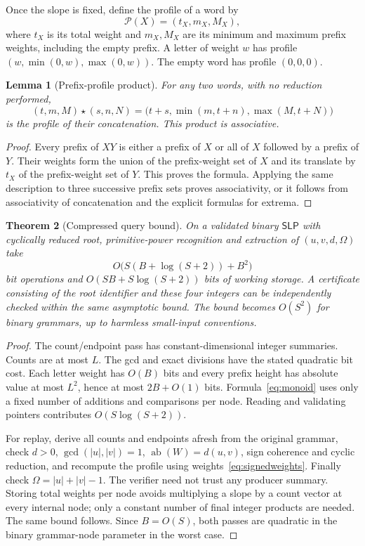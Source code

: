 \documentclass[11pt,letterpaper]{article}
\newtheorem{theorem}{Theorem}[section]
\newtheorem{lemma}[theorem]{Lemma}
\theoremstyle{definition}
\newcommand{\ab}{\operatorname{ab}}
\newcommand{\SLP}{\mathsf{SLP}}
\begin{document}
Once the slope is fixed, define the profile of a word by
\[
 \mathcal P(X)=(t_X,m_X,M_X),
\]
where $t_X$ is its total weight and $m_X,M_X$ are its minimum and maximum
prefix weights, including the empty prefix. A letter of weight $w$ has
profile $(w,\min(0,w),\max(0,w))$. The empty word has profile $(0,0,0)$.

\begin{lemma}[Prefix-profile product]
\label{lem:monoid}
For any two words, with no reduction performed,
\begin{equation}
 (t,m,M)\star(s,n,N)
 =\bigl(t+s,\min(m,t+n),\max(M,t+N)\bigr)
 \label{eq:monoid}
\end{equation}
is the profile of their concatenation. This product is associative.
\end{lemma}
\begin{proof}
Every prefix of $XY$ is either a prefix of $X$ or all of $X$ followed by a
prefix of $Y$. Their weights form the union of the prefix-weight set of $X$
and its translate by $t_X$ of the prefix-weight set of $Y$. This proves the
formula. Applying the same description to three successive prefix sets
proves associativity, or it follows from associativity of concatenation and
the explicit formulas for extrema.
\end{proof}

\begin{theorem}[Compressed query bound]
\label{thm:query}
On a validated binary $\SLP$ with cyclically reduced root, primitive-power
recognition and extraction of $(u,v,d,\Omega)$ take
\begin{equation}
 O\bigl(S(B+\log(S+2))+B^2\bigr)
 \label{eq:localcost}
\end{equation}
bit operations and $O(SB+S\log(S+2))$ bits of working storage.
A certificate consisting of the root identifier and these four integers can
be independently checked within the same asymptotic bound. The bound becomes
$O(S^2)$ for binary grammars, up to harmless small-input conventions.
\end{theorem}
\begin{proof}
The count/endpoint pass has constant-dimensional integer summaries. Counts
are at most $L$. The gcd and exact divisions have the stated quadratic bit
cost. Each letter weight has $O(B)$ bits and every prefix height has absolute
value at most $L^2$, hence at most $2B+O(1)$ bits. Formula~\eqref{eq:monoid}
uses only a fixed number of additions and comparisons per node. Reading
and validating pointers contributes $O(S\log(S+2))$.

For replay, derive all counts and endpoints afresh from the original grammar,
check $d>0$, $\gcd(|u|,|v|)=1$, $\ab(W)=d(u,v)$, sign coherence and cyclic
reduction, and recompute the profile using weights~\eqref{eq:signedweights}.
Finally check $\Omega=|u|+|v|-1$. The verifier need not trust any producer
summary. Storing total weights per node avoids multiplying a slope by a
count vector at every internal node; only a constant number of final integer
products are needed. The same bound follows. Since $B=O(S)$, both passes are
quadratic in the binary grammar-node parameter in the worst case.
\end{proof}
\end{document}
